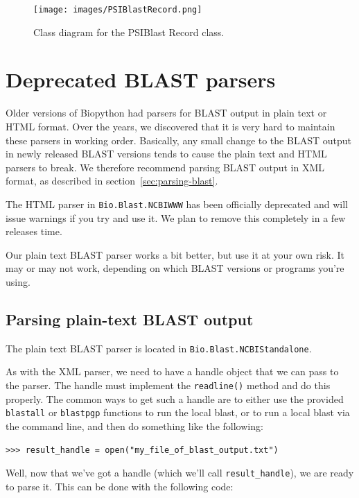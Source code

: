 \documentclass{report}
\begin{document}
\begin{latexonly}
\begin{figure}[htbp]
\centering
\texttt{[image: images/PSIBlastRecord.png]}
\caption{Class diagram for the PSIBlast Record class.}
\label{fig:psiblastrecord}
\end{figure}
\end{latexonly}

\section{Deprecated BLAST parsers}
\label{sec:parsing-blast-deprecated}

Older versions of Biopython had parsers for BLAST output in plain text or HTML
format. Over the years, we discovered that it is very hard to maintain these
parsers in working order. Basically, any small change to the BLAST output in
newly released BLAST versions tends to cause the plain text and HTML parsers
to break. We therefore recommend parsing BLAST output in XML format, as
described in section~\ref{sec:parsing-blast}.

The HTML parser in \verb|Bio.Blast.NCBIWWW| has been officially deprecated
and will issue warnings if you try and use it.  We plan to remove this
completely in a few releases time.

Our plain text BLAST parser works a bit better, but use it at your own risk.
It may or may not work, depending on which BLAST versions or programs you're
using.

\subsection{Parsing plain-text BLAST output}

The plain text BLAST parser is located in \verb|Bio.Blast.NCBIStandalone|.

As with the XML parser, we need to have a handle object that we can pass to the parser. The handle must implement the \verb|readline()| method and do this properly. The common ways to get such a handle are to either use the provided \verb|blastall| or \verb|blastpgp| functions to run the local blast, or to run a local blast via the command line, and then do something like the following:

\begin{verbatim}
>>> result_handle = open("my_file_of_blast_output.txt")
\end{verbatim}

Well, now that we've got a handle (which we'll call \verb|result_handle|),
we are ready to parse it. This can be done with the following code:
\end{document}
